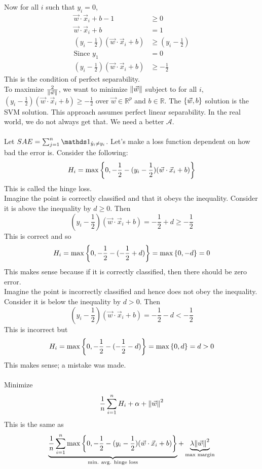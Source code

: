 \documentclass[12pt]{article}
\begin{document}
Now for all $i$ such that $y_i = 0$, $$ \begin{aligned} 
\vec{w} \cdot \vec{x}_i + b - 1 &\geq 0 \\ \vec{w} \cdot \vec{x}_i + b &= 1 \\ (y_i - \frac{1}{2})(\vec{w} \cdot \vec{x}_i + b) &\geq (y_i - \frac{1}{2}) \\ \text{Since } y_1 &= 0 \\ 
(y_i - \frac{1}{2})(\vec{w} \cdot \vec{x}_i + b) &\geq -\frac{1}{2} \end{aligned} $$ 
This is the condition of perfect separability. \\
To maximize $\frac{2}{\norm{\vec{w}}}$, we want to minimize $\norm{\vec{w}}$ subject to for all $i$, $(y_i - \frac{1}{2})(\vec{w} \cdot \vec{x}_i + b) \geq -\frac{1}{2}$ over $\vec{w} \in \mathbb{R}^p$ and $b \in \mathbb{R}$. The $\left\{ \vec{w}, b \right\}$ solution is the SVM solution. This approach assumes perfect linear separability. In the real world, we do not always get that. We need a better $\mathcal{A}$. \\~\\
Let $SAE = \sum_{j = 1}^n \indicator{\hat{y}_i \neq y_i}$. Let's make a loss function dependent on how bad the error is. Consider the following: 
$$H_i = \max \left\{ 0, -\frac{1}{2} - (y_i - \frac{1}{2})(\vec{w} \cdot \vec{x}_i + b) \right\}$$ This is called the hinge loss. \\ 
Imagine the point is correctly classified and that it obeys the inequality. Consider it is above the inequality by $d \geq 0$. Then 
$$ (y_i - \frac{1}{2})(\vec{w} \cdot \vec{x}_i + b) = - \frac{1}{2} + d \geq -\frac{1}{2}$$ 
This is correct and so $$ H_i = \max \left\{ 0, -\frac{1}{2} - (-\frac{1}{2} + d) \right\} = \max \left\{ 0,-d \right\} = 0 $$ 
This makes sense because if it is correctly classified, then there should be zero error. \\
Imagine the point is incorrectly classified and hence does not obey the inequality. Consider it is below the inequality by $d > 0$. Then 
$$ (y_i - \frac{1}{2})(\vec{w} \cdot \vec{x}_i + b) = -\frac{1}{2} - d < -\frac{1}{2}$$ 
This is incorrect but 
$$ H_i = \max \left\{ 0, -\frac{1}{2} - (-\frac{1}{2} - d) \right\} = \max \left\{ 0,d \right\} = d > 0 $$ 
This makes sense; a mistake was made. \\~\\
Minimize $$\frac{1}{n} \sum_{i=1}^n H_i + \alpha + \norm{\vec{w}}^2 $$ 
This is the same as 
$$ \underbrace{\frac{1}{n} \sum_{i = 1}^n \max \left\{ 0, -\frac{1}{2} - (y_i - \frac{1}{2})(\vec{w} \cdot \vec{x}_i + b) \right\}}_{\text{min. avg. hinge loss}} + \underbrace{\lambda \norm{\vec{w}}^2}_{\text{max margin}} $$ 
\end{document}
